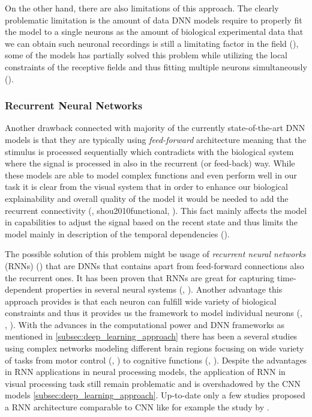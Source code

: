 On the other hand, there are also limitations of this approach. The clearly problematic limitation is the amount of data DNN models require to properly fit the model to a single neurons as the amount of biological experimental data that we can obtain such neuronal recordings is still a limitating factor in the field (\citet{zhang2019convolutional}), some of the models has partially solved this problem while utilizing the local constraints of the receptive fields and thus fitting multiple neurons simultaneously (\citet{antolik2016local}). 


\subsubsection{Recurrent Neural Networks}
\label{subsubsec:rnns}
Another drawback connected with majority of the currently state-of-the-art DNN models is that they are typically using \emph{feed-forward} architecture meaning that the stimulus is processed sequentially which contradicts with the biological system where the signal is processed in also in the recurrent (or feed-back) way. While these models are able to model complex functions and even perform well in our task it is clear from the visual system that in order to enhance our biological explainability and overall quality of the model it would be needed to add the recurrent connectivity (\citet{Kafaligonul2015rnn}, {shou2010functional}, \citet{kar2019evidence}). This fact mainly affects the model in capabilities to adjust the signal based on the recent state and thus limits the model mainly in description of the temporal dependencies (\citet{shou2010functional}).

The possible solution of this problem might be usage of \emph{recurrent neural networks} (RNNs) (\citet{medsker2001recurrent}) that are DNNs that contains apart from feed-forward connections also the recurrent ones. It has been proven that RNNs are great for capturing time-dependent properties in several neural systems (\citet{mante2013context}, \citet{song2016excinhrec}). Another advantage this approach provides is that each neuron can fulfill wide variety of biological constraints and thus it provides us the framework to model individual neurons (\citet{mante2013context}, \citet{masse2019circuit}, \citet{kim2019rnnframework}). With the advances in the computational power and DNN frameworks as mentioned in \ref{subsec:deep_learning_approach} there has been a several studies using complex networks modeling different brain regions focusing on wide variety of tasks from motor control (\citet{sussillo2015neural}, \citet{saxena2022motor}) to cognitive functions (\citet{masse2019circuit}, \citet{goudar2023schema}). Despite the advantages in RNN applications in neural processing models, the application of RNN in visual processing task still remain problematic and is overshadowed by the CNN models \ref{subsec:deep_learning_approach}. Up-to-date only a few studies proposed a RNN architecture comparable to CNN like for example the study by \citet{NEURIPS2024_f536d569}.


